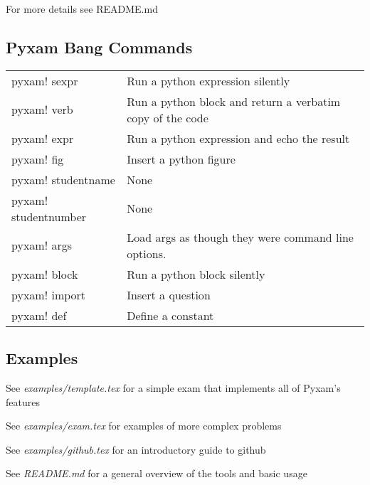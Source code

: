 \documentclass[9pt]{extarticle}
\begin{document}
\begin{multicols}{2}
For more details see README.md \\
\subsection*{Pyxam Bang Commands}

\begin{tabular}{l l}
pyxam! sexpr & 
    Run a python expression silently
    \\
pyxam! verb & 
    Run a python block and return a verbatim copy of the code
    \\
pyxam! expr & 
    Run a python expression and echo the result
    \\
pyxam! fig & 
    Insert a python figure
    \\
pyxam! studentname & None\\
pyxam! studentnumber & None\\
pyxam! args & 
    Load args as though they were command line options.
    \\
pyxam! block & 
    Run a python block silently
    \\
pyxam! import & 
    Insert a question
    \\
pyxam! def & 
    Define a constant
    
\end{tabular}
\subsection*{Examples}
\begin{description}
    \item See {\it examples/template.tex} for a simple exam that implements all of Pyxam's features 
    \item See {\it examples/exam.tex} for examples of more complex problems 
    \item See {\it examples/github.tex} for an introductory guide to github
    \item See {\it README.md} for a general overview of the tools and basic usage 
\end{description}

\end{multicols}
\end{document}

